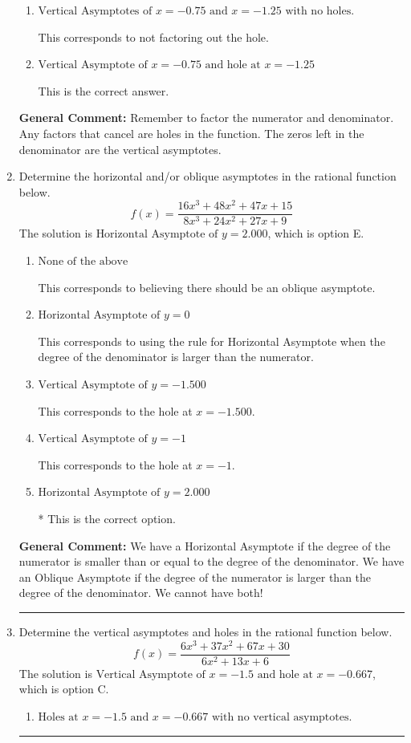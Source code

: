 \documentclass{extbook}[14pt]
\newcommand{\litem}[1]{\item #1

\rule{\textwidth}{0.4pt}}
\begin{document}
\begin{enumerate}
{\begin{enumerate}[label=\Alph*.]
This corresponds to considering where the denominator is equal to 0 as holes.
\item \( \text{Vertical Asymptotes of } x = -0.75 \text{ and } x = -1.25 \text{ with no holes.} \)

This corresponds to not factoring out the hole.
\item \( \text{Vertical Asymptote of } x = -0.75 \text{ and hole at } x = -1.25 \)

This is the correct answer.
\end{enumerate}

\textbf{General Comment:} Remember to factor the numerator and denominator. Any factors that cancel are holes in the function. The zeros left in the denominator are the vertical asymptotes.
}
\litem{
Determine the horizontal and/or oblique asymptotes in the rational function below.
\[ f(x) = \frac{16x^{3} +48 x^{2} +47 x + 15}{8x^{3} +24 x^{2} +27 x + 9} \]The solution is \( \text{Horizontal Asymptote of } y = 2.000  \), which is option E.\begin{enumerate}[label=\Alph*.]
\item \( \text{None of the above} \)

This corresponds to believing there should be an oblique asymptote.
\item \( \text{Horizontal Asymptote of } y = 0  \)

This corresponds to using the rule for Horizontal Asymptote when the degree of the denominator is larger than the numerator.
\item \( \text{Vertical Asymptote of } y = -1.500  \)

This corresponds to the hole at $x = -1.500$.
\item \( \text{Vertical Asymptote of } y = -1  \)

This corresponds to the hole at $x = -1$.
\item \( \text{Horizontal Asymptote of } y = 2.000  \)

* This is the correct option.
\end{enumerate}

\textbf{General Comment:} We have a Horizontal Asymptote if the degree of the numerator is smaller than or equal to the degree of the denominator. We have an Oblique Asymptote if the degree of the numerator is larger than the degree of the denominator. We cannot have both!
}
\litem{
Determine the vertical asymptotes and holes in the rational function below.
\[ f(x) = \frac{6x^{3} +37 x^{2} +67 x + 30}{6x^{2} +13 x + 6} \]The solution is \( \text{Vertical Asymptote of } x = -1.5 \text{ and hole at } x = -0.667 \), which is option C.\begin{enumerate}[label=\Alph*.]
\item \( \text{Holes at } x = -1.5 \text{ and } x = -0.667 \text{ with no vertical asymptotes.} \)


\end{enumerate}}
\end{enumerate}
\end{document}
